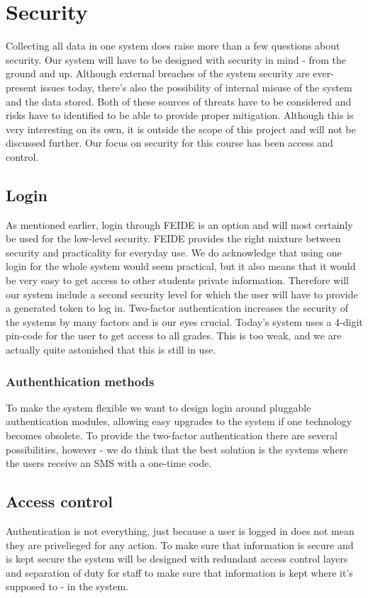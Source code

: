 \section{Security}

Collecting all data in one system does raise more than a few questions about security. Our system will have to be designed with security in mind - from the ground and up. 
Although external breaches of the system security are ever-present issues today, there's also the possibility of internal misuse of the system and the data stored. Both of these 
sources of threats have to be considered and risks have to identified to be able to provide proper mitigation. Although this is very interesting on its own, it is outside the scope 
of this project and will not be discussed further. Our focus on security for this course has been access and control.

\subsection{Login}
As mentioned earlier, login through FEIDE is an option and will most certainly be used for the low-level security. FEIDE provides the right mixture between security and practicality for everyday use. We do acknowledge that using one login for the whole system would seem practical, but it also means that it would be very easy to get access to other students private information. Therefore will our system include a second security level for which the user will have to provide a generated token to log in. Two-factor authentication increases the security of the systems by many factors and is our eyes crucial. Today's system uses a 4-digit pin-code for the user to get access to all grades. This is too weak, and we are actually quite astonished that this is still in use. 

\subsubsection{Authenthication methods}
To make the system flexible we want to design login around pluggable authentication modules, allowing easy upgrades to the system if one technology becomes obsolete. To provide the 
two-factor authentication there are several possibilities, however - we do think that the best solution is the systems where the users receive an SMS with a one-time code. 

\subsection{Access control}
Authentication is not everything, just because a user is logged in does not mean they are privelieged for any action. To make sure that information is secure and is kept secure the system will be designed with redundant access control layers and separation of duty for staff to make sure that information is kept where it's supposed to - in the system. 
